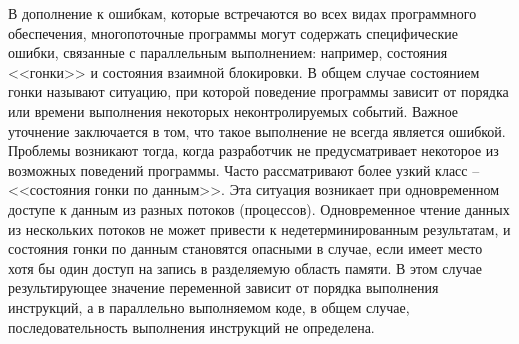 


В дополнение к ошибкам, которые встречаются во всех видах программного обеспечения, многопоточные программы могут содержать специфические ошибки, связанные с параллельным выполнением: например, состояния <<гонки>> и состояния взаимной блокировки.
В общем случае состоянием гонки называют ситуацию, при которой поведение программы зависит от порядка или времени выполнения некоторых неконтролируемых событий.
Важное уточнение заключается в том, что такое выполнение не всегда является ошибкой.
Проблемы возникают тогда, когда разработчик не предусматривает некоторое из возможных поведений программы.
Часто рассматривают более узкий класс -- <<состояния гонки по данным>>. Эта ситуация возникает при одновременном доступе к данным из разных потоков (процессов).
Одновременное чтение данных из нескольких потоков не может привести к недетерминированным результатам, и состояния гонки по данным становятся опасными в случае, если имеет место хотя бы один доступ на запись в разделяемую область памяти.
В этом случае результирующее значение переменной зависит от порядка выполнения инструкций, а в параллельно выполняемом коде, в общем случае, последовательность выполнения инструкций не определена. 

